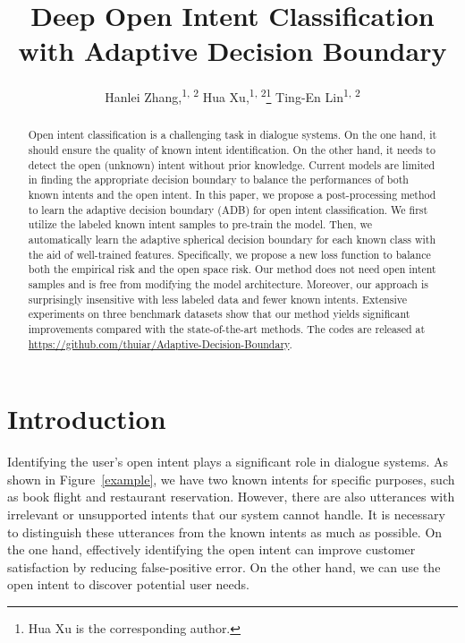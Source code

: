 \documentclass[letterpaper]{article} %
\title{Deep Open Intent Classification with Adaptive Decision Boundary}
\author{
Hanlei Zhang,\textsuperscript{\rm 1, 2}
Hua Xu,\textsuperscript{\rm 1, 2}\thanks{Hua Xu is the corresponding author.}
Ting-En Lin\textsuperscript{\rm 1, 2}\\
}
\begin{document}
\maketitle

\begin{abstract}
Open intent classification is a challenging task in dialogue systems. On the one hand, it should ensure the quality of known intent identification. On the other hand, it needs to detect the open (unknown) intent without prior knowledge. Current models are limited in finding the appropriate decision boundary to balance the performances of both known intents and the open intent. In this paper, we propose a post-processing method to learn the adaptive decision boundary (ADB) for open intent classification. We first utilize the labeled known intent samples to pre-train the model. Then, we automatically learn the adaptive spherical decision boundary for each known class with the aid of well-trained features. Specifically, we propose a new loss function to balance both the empirical risk and the open space risk. Our method does not need open intent samples and is free from modifying the model architecture. Moreover, our approach is surprisingly insensitive with less labeled data and fewer known intents. Extensive experiments on three benchmark datasets show that our method yields significant improvements compared with the state-of-the-art methods. The codes are released at \url{https://github.com/thuiar/Adaptive-Decision-Boundary}.

\end{abstract}

\section{Introduction}
Identifying the user's open intent plays a significant role in dialogue systems. As shown in Figure~\ref{example}, we have two known intents for specific purposes, such as book flight and restaurant reservation. However, there are also utterances with irrelevant or unsupported intents that our system cannot handle. It is necessary to distinguish these utterances from the known intents as much as possible. On the one hand, effectively identifying the open intent can improve customer satisfaction by reducing false-positive error. On the other hand, we can use the open intent to discover potential user needs.
\end{document}
